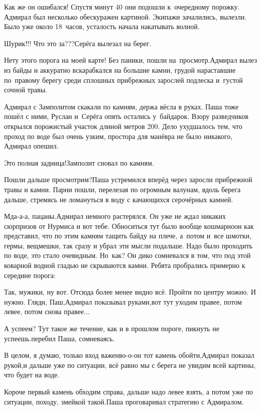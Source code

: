 Как же он ошибался! Спустя минут 40 они подошли к~очередному порожку. Адмирал был несколько обескуражен картиной. Экипажи зачалились, вылезли. Было уже около 18~часов, усталость начала накатывать волной.

\diagdash Шурик!!! Что это за???\mdash Серёга вылезал на берег.

\diagdash Нету этого порога на моей карте! Без паники, пошли на~просмотр.\mdash Адмирал вылез из байды и аккуратно вскарабкался на большие камни, грудой нараставшие по~правому берегу среди сплошных прибрежных зарослей подлеска и~густой сочной травы.

Адмирал с Замполитом скакали по камням, держа вёсла в руках. Паша тоже пошёл с ними, Руслан и~Серёга опять остались у~байдарок. Взору разведчиков открылся порожистый участок длиной метров 200. Дело ухудшалось тем, что проход по воде был очень узким, простора для манёвра не было никакого, Адмирал опешил.

\diagdash Это полная задница!\mdash Замполит сновал по камням.

\diagdash Пошли дальше просмотрим?\mdash Паша устремился вперёд через заросли прибрежной травы и камни. Парни пошли, перелезая по огромным валунам, вдоль берега дальше, стремясь не ломануться в воду с качающихся серо\sdash чёрных камней.

\diagdash Мда-а-а, пацаны.\mdash Адмирал немного растерялся. Он уже не ждал никаких сюрпризов от Нурмиса и вот тебе. Обноситься тут было вообще кошмарно\mdash он как представил, что по этим камням тащить байду на плече, а~потом и~все шмотки, гермы, вещмешки, так сразу и убрал эти мысли подальше. Надо было проходить по воде, это стало очевидным. Но~как? Он дико сомневался в том, что под этой коварной водной гладью не скрываются камни. Ребята пробрались примерно к середине порога:

\diagdash Так, мужики, ну вот. Отсюда более менее видно всё. Пройти по центру можно. И нужно. Гляди, Паш,\mdash Адмирал показывал руками,\mdash вот тут уходим правее, потом левее, потом снова правее$\ldots$

\diagdash А успеем? Тут такое же течение, как и в прошлом пороге, пикнуть не успеешь.\mdash перебил Паша, сомневаясь.

\diagdash В целом, я думаю, только вход важен\mdash во-о-он тот камень обойти,\mdash Адмирал показал рукой,\mdash и дальше уже по ситуации, всё равно мы с берега не увидим всей картины, что будет на воде.

\diagdash Короче первый камень обходим справа, дальше надо левее взять, а потом уже по ситуации, походу, змейкой такой.\mdash Паша проговаривал стратегию с Адмиралом. 


